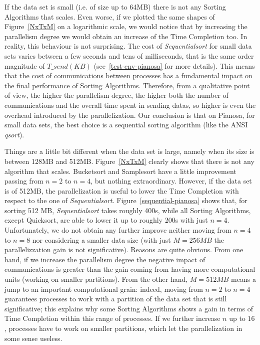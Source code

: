 If the data set is small (i.e. of size up to 64MB) there is not any Sorting Algorithms that scales. Even worse, if we plotted the same shapes of Figure~\ref{NxTxM} on a logarithmic scale, we would notice that by increasing the parallelism degree we would obtain an increase of the Time Completion too. In reality, this behaviour is not surprising. The cost of \textit{Sequentialsort} for small data sets varies between a few seconds and tens of milliseconds, that is the same order magnitude of $T\_send( KB )$ (see~\ref{test-env-pianosa} for more details). This means that the cost of communications between processes has a fundamental impact on the final performance of Sorting Algorithms. Therefore, from a qualitative point of view, the higher the parallelism degree, the higher both the number of communications and the overall time spent in sending datas, so higher is even the overhead introduced by the parallelization. Our conclusion is that on Pianosa, for small data sets, the best choice is a sequential sorting algorithm (like the ANSI \textit{qsort}).

Things are a little bit different when the data set is large, namely when its size is between 128MB and 512MB. Figure~\ref{NxTxM} clearly shows that there is not any algorithm that scales. Bucketsort and Samplesort have a little improvement passing from $n=2$ to $n=4$, but nothing extraordinary. However, if the data set is of 512MB, the parallelization is useful to lower the Time Completion with respect to the one of \textit{Sequentialsort}. Figure~\ref{sequential-pianosa} shows that, for sorting 512 MB, \textit{Sequentialsort} takes roughly 400s, while all Sorting Algorithms, except Quicksort, are able to lower it up to roughly 200s with just $n=4$. Unfortunately, we do not obtain any further improve neither moving from $n=4$ to $n=8$ nor considering a smaller data size (with just $M=256MB$ the parallelizzation gain is not significative). Reasons are quite obvious. From one hand, if we increase the parallelism degree the negative impact of communications is greater than the gain coming from having more computational units (working on smaller partitions).  From the other hand, $M=512MB$ means a jump to an important computational grain: indeed, moving from $n=2$ to $n=4$ guarantees processes to work with a partition of the data set that is still significative; this explains why some Sorting Algorithms shows a gain in terms of Time Completion within this range of processes. If we further increase $n$ up to $16$, processes have to work on smaller partitions, which let the parallelization in some sense useless.




